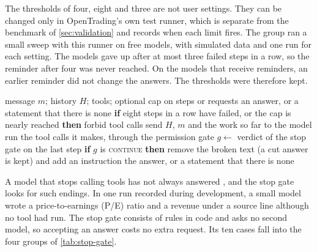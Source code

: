 The thresholds of four, eight and three are not user settings.
They can be changed only in OpenTrading's own test runner, which is separate from the benchmark of \cref{sec:validation} and records when each limit fires.
The group ran a small sweep with this runner on free models, with simulated data and one run for each setting.
The models gave up after at most three failed steps in a row, so the reminder after four was never reached.
On the models that receive reminders, an earlier reminder did not change the answers.
The thresholds were therefore kept.

\begin{algorithm}[H]
  \caption{One turn of the agent loop}\label{alg:turn}
  \begin{algorithmic}[1]
    \Require message $m$; history $H$; tools; optional cap on steps or requests
    \Ensure an answer, or a statement that there is none
    \Repeat
      \Repeat {}
        \State \textbf{if} eight steps in a row have failed, or the cap is nearly reached \textbf{then} forbid tool calls
        \State send $H$, $m$ and the work so far to the model
        \State run the tool calls it makes, through the permission gate
      \State $g \gets$ verdict of the stop gate on the last step
      \State \textbf{if} $g$ is \textsc{continue} \textbf{then} remove the broken text (a cut answer is kept) and add an instruction
    \State \Return the answer, or a statement that there is none
  \end{algorithmic}
\end{algorithm}

A model that stops calling tools has not always answered \parencite{anthropic2025harnesses}, and the stop gate looks for such endings.
In one run recorded during development, a small model wrote a price-to-earnings (P/E) ratio and a revenue under a source line although no tool had run.
The stop gate consists of rules in code and asks no second model, so accepting an answer costs no extra request.
Its ten cases fall into the four groups of \cref{tab:stop-gate}.

